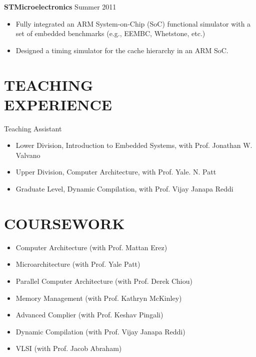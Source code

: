 \documentclass[margin, 9pt]{res} %
\begin{document}
\begin{resume}
\medskip
{\large\textbf{STMicroelectronics}} \hfill{Summer 2011}\\
\vspace*{-10pt}
\begin{itemize}[leftmargin=*] \itemsep -3pt
\vspace*{-5pt}
	\item Fully integrated an ARM System-on-Chip (SoC) functional simulator with a set of embedded benchmarks (e.g., EEMBC, Whetstone, etc.)
	\item Designed a timing simulator for the cache hierarchy in an ARM SoC.
\end{itemize}


\section{TEACHING\\ EXPERIENCE} 

{\large{Teaching Assistant}}\\
\vspace*{-5pt}
\begin{itemize}[leftmargin=*] \itemsep -2pt
\vspace*{-5pt}
	\item Lower Division, Introduction to Embedded Systems, with Prof. Jonathan W. Valvano
	\item Upper Division, Computer Architecture, with Prof. Yale. N. Patt
	\item Graduate Level, Dynamic Compilation, with Prof. Vijay Janapa Reddi
\end{itemize}


\section{COURSEWORK} 

\vspace*{-2pt}
\begin{itemize}[leftmargin=*] \itemsep -2pt
	\item Computer Architecture (with Prof. Mattan Erez)
	\item Microarchitecture (with Prof. Yale Patt)
	\item Parallel Computer Architecture (with Prof. Derek Chiou)
	\item Memory Management (with Prof. Kathryn McKinley)
	\item Advanced Complier (with Prof. Keshav Pingali)
	\item Dynamic Compilation (with Prof. Vijay Janapa Reddi)
	\item VLSI (with Prof. Jacob Abraham)
\end{itemize}
\end{resume}
\end{document}
